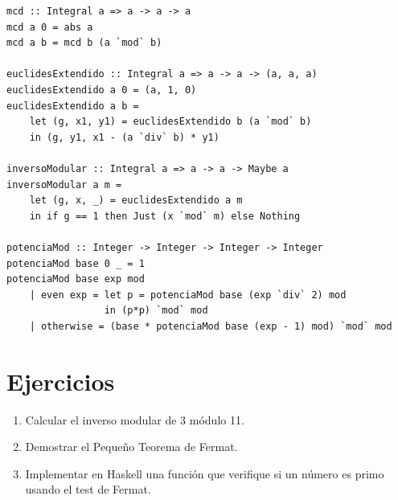 \begin{lstlisting}[caption={Aritmética modular en Haskell}]
mcd :: Integral a => a -> a -> a
mcd a 0 = abs a
mcd a b = mcd b (a `mod` b)

euclidesExtendido :: Integral a => a -> a -> (a, a, a)
euclidesExtendido a 0 = (a, 1, 0)
euclidesExtendido a b =
    let (g, x1, y1) = euclidesExtendido b (a `mod` b)
    in (g, y1, x1 - (a `div` b) * y1)

inversoModular :: Integral a => a -> a -> Maybe a
inversoModular a m =
    let (g, x, _) = euclidesExtendido a m
    in if g == 1 then Just (x `mod` m) else Nothing

potenciaMod :: Integer -> Integer -> Integer -> Integer
potenciaMod base 0 _ = 1
potenciaMod base exp mod
    | even exp = let p = potenciaMod base (exp `div` 2) mod
                 in (p*p) `mod` mod
    | otherwise = (base * potenciaMod base (exp - 1) mod) `mod` mod
\end{lstlisting}

\section{Ejercicios}
\begin{enumerate}
  \item Calcular el inverso modular de 3 módulo 11.
  \item Demostrar el Pequeño Teorema de Fermat.
  \item Implementar en Haskell una función que verifique si un número es primo usando el test de Fermat.
\end{enumerate}